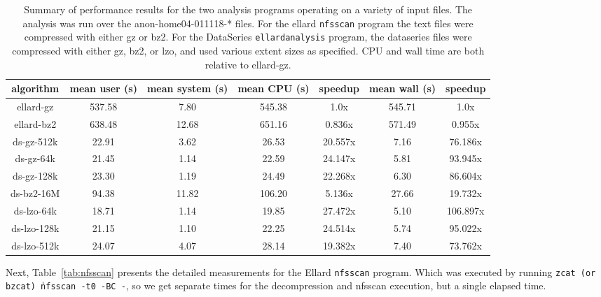 \begin{table}
\begin{tabular}{|c|c|c|c|c|c|c|} \hline
algorithm   & mean user (s) & mean system (s) & mean CPU (s) & speedup & mean wall (s)& speedup  \\ \hline
ellard-gz   & 537.58    &  7.80       & 545.38   &  1.0x   & 545.71    &   1.0x   \\
ellard-bz2  & 638.48    & 12.68       & 651.16   &  0.836x & 571.49    &   0.955x \\
ds-gz-512k  &  22.91    &  3.62       &  26.53   & 20.557x &   7.16    &  76.186x \\
ds-gz-64k   &  21.45    &  1.14       &  22.59   & 24.147x &   5.81    &  93.945x \\
ds-gz-128k  &  23.30    &  1.19       &  24.49   & 22.268x &   6.30    &  86.604x \\
ds-bz2-16M  &  94.38    & 11.82       & 106.20   &  5.136x &  27.66    &  19.732x \\
ds-lzo-64k  &  18.71    &  1.14       &  19.85   & 27.472x &   5.10    & 106.897x \\
ds-lzo-128k &  21.15    &  1.10       &  22.25   & 24.514x &   5.74    &  95.022x \\
ds-lzo-512k &  24.07    &  4.07       &  28.14   & 19.382x &   7.40    &  73.762x \\ \hline
\end{tabular}
\label{tab:summary}

\caption{Summary of performance results for the two analysis programs
operating on a variety of input files.  The analysis was run over the
anon-home04-011118-* files.  For the ellard \texttt{nfsscan} program
the text files were compressed with either gz or bz2.  For the
DataSeries \texttt{ellardanalysis} program, the dataseries files were
compressed with either gz, bz2, or lzo, and used various extent sizes
as specified.  CPU and wall time are both relative to ellard-gz.}

\end{table}

Next, Table~\ref{tab:nfsscan} presents the detailed measurements for
the Ellard \texttt{nfsscan} program.  Which was executed by running
\texttt{zcat (or bzcat) \| nfsscan -t0 -BC -}, so we get separate
times for the decompression and nfsscan execution, but a single
elapsed time.

